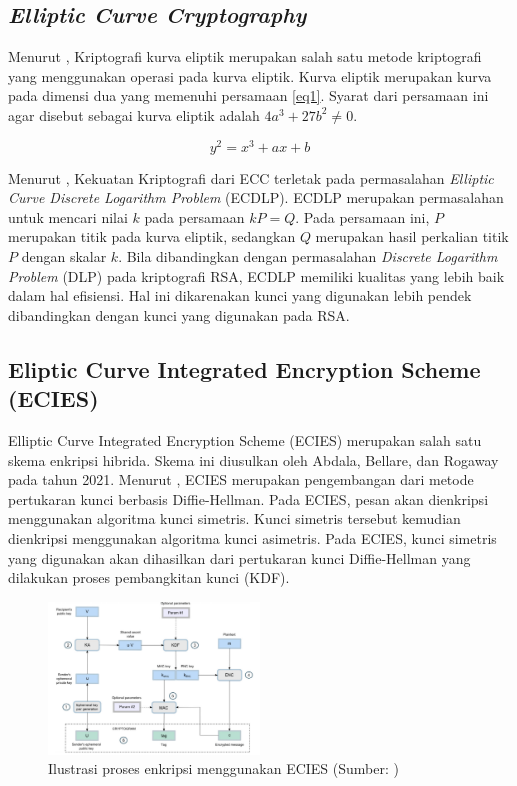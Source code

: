 \documentclass[conference]{IEEEtran}
\begin{document}
\subsection{\emph{Elliptic Curve Cryptography}}
Menurut \cite{b1}, Kriptografi kurva eliptik merupakan salah satu metode kriptografi yang menggunakan operasi pada kurva eliptik. Kurva eliptik merupakan kurva pada dimensi dua yang memenuhi persamaan \ref{eq1}. Syarat dari persamaan ini agar disebut sebagai kurva eliptik adalah $4a^3 + 27b^2 \neq 0$.

\begin{equation}
    \label{eq1}
    y^2 = x^3 + ax + b
\end{equation}

Menurut \cite{b2}, Kekuatan Kriptografi dari ECC terletak pada permasalahan \emph{Elliptic Curve Discrete Logarithm Problem} (ECDLP). ECDLP merupakan permasalahan untuk mencari nilai $k$ pada persamaan $kP = Q$. Pada persamaan ini, $P$ merupakan titik pada kurva eliptik, sedangkan $Q$ merupakan hasil perkalian titik $P$ dengan skalar $k$. Bila dibandingkan dengan permasalahan \emph{Discrete Logarithm Problem} (DLP) pada kriptografi RSA, ECDLP memiliki kualitas yang lebih baik dalam hal efisiensi. Hal ini dikarenakan kunci yang digunakan lebih pendek dibandingkan dengan kunci yang digunakan pada RSA.

\subsection{Eliptic Curve Integrated Encryption Scheme (ECIES)}
\label{sec:ecies}

Elliptic Curve Integrated Encryption Scheme (ECIES) merupakan salah satu skema enkripsi hibrida. Skema ini diusulkan oleh Abdala, Bellare, dan Rogaway pada tahun 2021. Menurut \cite{b3}, ECIES merupakan pengembangan dari metode pertukaran kunci berbasis Diffie-Hellman. Pada ECIES, pesan akan dienkripsi menggunakan algoritma kunci simetris. Kunci simetris tersebut kemudian dienkripsi menggunakan algoritma kunci asimetris. Pada ECIES, kunci simetris yang digunakan akan dihasilkan dari pertukaran kunci Diffie-Hellman yang dilakukan proses pembangkitan kunci (KDF). 

\begin{figure}[htbp]
    \centerline{\includegraphics[width=0.5\textwidth]{res/ecies.png}}
    \caption{Ilustrasi proses enkripsi menggunakan ECIES (Sumber: \cite{b7})}
    \label{fig:ecies}
\end{figure}
\end{document}
